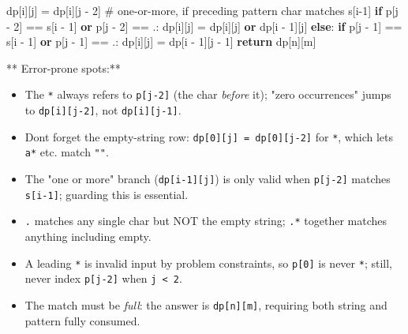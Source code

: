 \documentclass[11pt]{article}
\providecommand{\tightlist}{\setlength{\itemsep}{1pt}\setlength{\parskip}{0pt}}
\newenvironment{Shaded}{\begin{snugshade}}{\end{snugshade}}
\newcommand{\CommentTok}[1]{\textcolor[rgb]{0.48,0.49,0.49}{#1}}
\newcommand{\ControlFlowTok}[1]{\textcolor[rgb]{0.99,0.74,0.29}{\textbf{#1}}}
\newcommand{\DecValTok}[1]{\textcolor[rgb]{0.96,0.45,0.00}{#1}}
\newcommand{\KeywordTok}[1]{\textcolor[rgb]{0.81,0.81,0.76}{\textbf{#1}}}
\newcommand{\NormalTok}[1]{\textcolor[rgb]{0.81,0.81,0.76}{#1}}
\newcommand{\OperatorTok}[1]{\textcolor[rgb]{0.81,0.81,0.76}{#1}}
\newcommand{\StringTok}[1]{\textcolor[rgb]{0.96,0.31,0.31}{#1}}
\begin{document}
\begin{Shaded}
\begin{Highlighting}[]
\NormalTok{                dp[i][j] }\OperatorTok{=}\NormalTok{ dp[i][j }\OperatorTok{{-}} \DecValTok{2}\NormalTok{]}
                \CommentTok{\# one{-}or{-}more, if preceding pattern char matches s[i{-}1]}
                \ControlFlowTok{if}\NormalTok{ p[j }\OperatorTok{{-}} \DecValTok{2}\NormalTok{] }\OperatorTok{==}\NormalTok{ s[i }\OperatorTok{{-}} \DecValTok{1}\NormalTok{] }\KeywordTok{or}\NormalTok{ p[j }\OperatorTok{{-}} \DecValTok{2}\NormalTok{] }\OperatorTok{==} \StringTok{\textquotesingle{}.\textquotesingle{}}\NormalTok{:}
\NormalTok{                    dp[i][j] }\OperatorTok{=}\NormalTok{ dp[i][j] }\KeywordTok{or}\NormalTok{ dp[i }\OperatorTok{{-}} \DecValTok{1}\NormalTok{][j]}
            \ControlFlowTok{else}\NormalTok{:}
                \ControlFlowTok{if}\NormalTok{ p[j }\OperatorTok{{-}} \DecValTok{1}\NormalTok{] }\OperatorTok{==}\NormalTok{ s[i }\OperatorTok{{-}} \DecValTok{1}\NormalTok{] }\KeywordTok{or}\NormalTok{ p[j }\OperatorTok{{-}} \DecValTok{1}\NormalTok{] }\OperatorTok{==} \StringTok{\textquotesingle{}.\textquotesingle{}}\NormalTok{:}
\NormalTok{                    dp[i][j] }\OperatorTok{=}\NormalTok{ dp[i }\OperatorTok{{-}} \DecValTok{1}\NormalTok{][j }\OperatorTok{{-}} \DecValTok{1}\NormalTok{]}
    \ControlFlowTok{return}\NormalTok{ dp[n][m]}
\end{Highlighting}
\end{Shaded}

** Error-prone spots:**

\begin{itemize}
\tightlist
\item
  The \texttt{*} always refers to \texttt{p{[}j-2{]}} (the char \emph{before} it); "zero occurrences" jumps to \texttt{dp{[}i{]}{[}j-2{]}}, not \texttt{dp{[}i{]}{[}j-1{]}}.
\item
  Don\textquotesingle t forget the empty-string row: \texttt{dp{[}0{]}{[}j{]}\ =\ dp{[}0{]}{[}j-2{]}} for \texttt{*}, which lets \texttt{a*} etc. match \texttt{""}.
\item
  The "one or more" branch (\texttt{dp{[}i-1{]}{[}j{]}}) is only valid when \texttt{p{[}j-2{]}} matches \texttt{s{[}i-1{]}}; guarding this is essential.
\item
  \texttt{.} matches any single char but NOT the empty string; \texttt{.*} together matches anything including empty.
\item
  A leading \texttt{*} is invalid input by problem constraints, so \texttt{p{[}0{]}} is never \texttt{\textquotesingle{}*\textquotesingle{}}; still, never index \texttt{p{[}j-2{]}} when \texttt{j\ \textless{}\ 2}.
\item
  The match must be \emph{full}: the answer is \texttt{dp{[}n{]}{[}m{]}}, requiring both string and pattern fully consumed.
\end{itemize}
\end{document}
